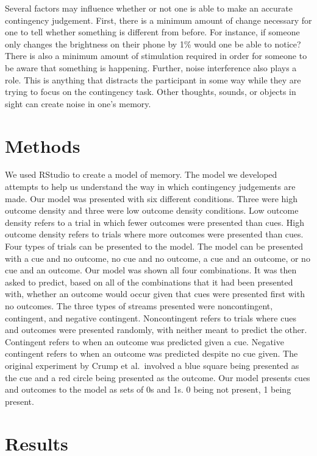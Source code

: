 \documentclass[
  english,
  man]{apa6}
\begin{document}
Several factors may influence whether or not one is able to make an accurate contingency judgement. First, there is a minimum amount of change necessary for one to tell whether something is different from before. For instance, if someone only changes the brightness on their phone by 1\% would one be able to notice? There is also a minimum amount of stimulation required in order for someone to be aware that something is happening. Further, noise interference also plays a role. This is anything that distracts the participant in some way while they are trying to focus on the contingency task. Other thoughts, sounds, or objects in sight can create noise in one's memory.

\hypertarget{methods}{%
\section{Methods}\label{methods}}

We used RStudio to create a model of memory. The model we developed attempts to help us understand the way in which contingency judgements are made. Our model was presented with six different conditions. Three were high outcome density and three were low outcome density conditions. Low outcome density refers to a trial in which fewer outcomes were presented than cues. High outcome density refers to trials where more outcomes were presented than cues. Four types of trials can be presented to the model. The model can be presented with a cue and no outcome, no cue and no outcome, a cue and an outcome, or no cue and an outcome. Our model was shown all four combinations. It was then asked to predict, based on all of the combinations that it had been presented with, whether an outcome would occur given that cues were presented first with no outcomes. The three types of streams presented were noncontingent, contingent, and negative contingent. Noncontingent refers to trials where cues and outcomes were presented randomly, with neither meant to predict the other. Contingent refers to when an outcome was predicted given a cue. Negative contingent refers to when an outcome was predicted despite no cue given.
The original experiment by Crump et al.~involved a blue square being presented as the cue and a red circle being presented as the outcome. Our model presents cues and outcomes to the model as sets of 0s and 1s. 0 being not present, 1 being present.

\hypertarget{results}{%
\section{Results}\label{results}}
\end{document}
